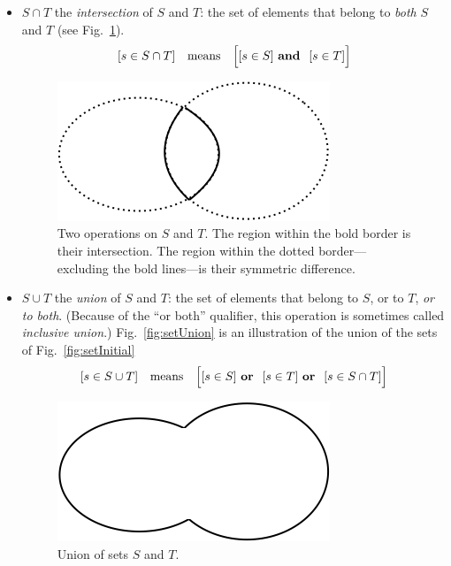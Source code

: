 \begin{itemize}
\item
$S \cap T$ the {\it
  intersection}
of $S$ and $T$: the set of elements that belong to {\em both} $S$ and
$T$ (see Fig.~\ref{fig:setIntersection}).
\[ [s \in S \cap T] \ \ \mbox{ means } \ \ 
\Big[ [s \in S] \ \mbox{\bf and } \ [s \in T] \Big]
\]
\begin{figure}[htb]
\begin{center}
        \includegraphics[scale=0.4]{FiguresMaths/setIntersection}
        \caption{Two operations on $S$ and $T$. The region within the bold border is their intersection. The region within the dotted border---excluding the bold lines---is their symmetric difference.}
        \label{fig:setIntersection}
\end{center}
\end{figure}
\item
$S \cup T$ the {\it
  union}
of $S$ and $T$: the set of elements that belong to $S$, or to $T$, {\em
  or to both}.  (Because of the ``or both'' qualifier, this operation
is sometimes called {\em inclusive
  union}.)
  Fig.~\ref{fig:setUnion} is an illustration of the union of the sets of Fig.~\ref{fig:setInitial}
\[ [s \in S \cup T] \ \ \mbox{ means } \ \
\Big[ [s \in S] \ \mbox{\bf or } \ [s \in T]  \ \mbox{\bf or } \ [s
    \in S \cap T] \Big]
\]
\begin{figure}[htb]
\begin{center}
        \includegraphics[scale=0.4]{FiguresMaths/setUnion}
        \caption{Union of sets $S$ and $T$.}

\end{center}
\end{figure}
\end{itemize}
